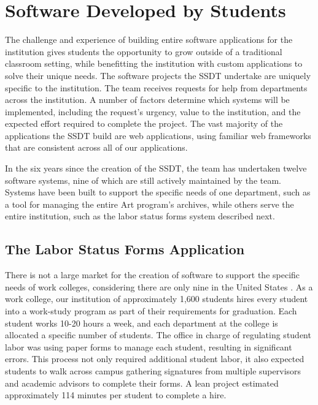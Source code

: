 \section{Software Developed by Students}

The challenge and experience of building entire software applications for the institution gives students the opportunity to grow outside of a traditional classroom setting, while benefitting the institution with custom applications to solve their unique needs. The software projects the SSDT undertake are uniquely specific to the institution. The team receives requests for help from departments across the institution. A number of factors determine which systems will be implemented, including the request’s urgency, value to the institution, and the expected effort required to complete the project. The vast majority of the applications the SSDT build are web applications, using familiar web frameworks that are consistent across all of our applications.

In the six years since the creation of the SSDT, the team has undertaken twelve software systems, nine of which are still actively maintained by the team. Systems have been built to support the specific needs of one department, such as a tool for managing the entire Art program's archives, while others serve the entire institution, such as the labor status forms system described next.

\subsection{The Labor Status Forms Application}\label{sec:software}
There is not a large market for the creation of software to support the specific needs of work colleges, considering there are only nine in the United States \cite{WCCMembers, Ecclesia}. As a work college, our institution of approximately 1,600 students hires every student into a work-study program as part of their requirements for graduation. Each student works 10-20 hours a week, and each department at the college is allocated a specific number of students. The office in charge of regulating student labor was using paper forms to manage each student, resulting in significant errors. This process not only required additional student labor, it also expected students to walk across campus gathering signatures from multiple supervisors and academic advisors to complete their forms. A lean project estimated approximately 114 minutes per student to complete a hire.

